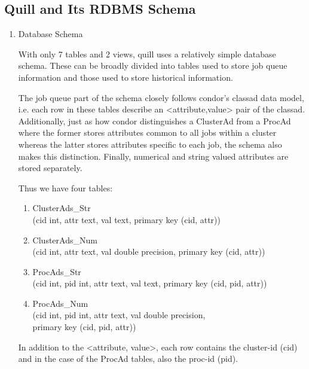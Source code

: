 \subsection{\label{sec:Quill-Schema}Quill and Its RDBMS Schema}

\begin{enumerate}
\item Database Schema

With only 7 tables and 2 views, quill uses a relatively simple database
schema.  These can be broadly divided into tables used to store job
queue information and those used to store historical information.

The job queue part of the schema closely follows condor's classad data
model, i.e. each row in these tables describe an <attribute,value>
pair of the classad.  Additionally, just as how condor distinguishes a
ClusterAd from a ProcAd where the former stores attributes common to all
jobs within a cluster whereas the latter stores attributes specific to
each job, the schema also makes this distinction.  Finally, numerical
and string valued attributes are stored separately.

Thus we have four tables:

\begin{enumerate}

\item 
	ClusterAds\_Str\\
	(cid int, attr text, val text, primary key (cid, attr))

\item 
	ClusterAds\_Num\\
	(cid int, attr text, val double precision, primary key (cid, attr))

\item 
	ProcAds\_Str\\
	(cid int, pid int, attr text, val text, primary key (cid, pid, attr))

\item 
	ProcAds\_Num\\
	(cid int, pid int, attr text, val double precision,\\
		primary key (cid, pid, attr))

\end{enumerate}

In addition to the <attribute, value>, each row contains the cluster-id
(cid) and in the case of the ProcAd tables, also the proc-id (pid).


\end{enumerate}
